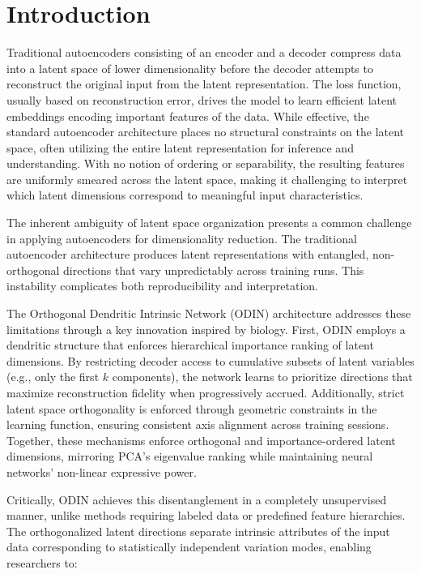 \documentclass[twoside,11pt]{article}
\begin{document}
\section{Introduction}
Traditional autoencoders consisting of an encoder and a decoder compress data into a latent space of lower dimensionality before the decoder attempts to reconstruct the original input from the latent representation. The loss function, usually based on reconstruction error, drives the model to learn efficient latent embeddings encoding important features of the data. While effective, the standard autoencoder architecture places no structural constraints on the latent space, often utilizing the entire latent representation for inference and understanding. With no notion of ordering or separability, the resulting features are uniformly smeared across the latent space, making it challenging to interpret which latent dimensions correspond to meaningful input characteristics. 

The inherent ambiguity of latent space organization presents a common challenge in applying autoencoders for dimensionality reduction. The traditional autoencoder architecture produces latent representations with entangled, non-orthogonal directions that vary unpredictably across training runs. This instability complicates both reproducibility and interpretation.

The Orthogonal Dendritic Intrinsic Network (ODIN) architecture addresses these limitations through a key innovation inspired by biology. First, ODIN employs a dendritic structure that enforces hierarchical importance ranking of latent dimensions. By restricting decoder access to cumulative subsets of latent variables (e.g., only the first $k$ components), the network learns to prioritize directions that maximize reconstruction fidelity when progressively accrued. Additionally, strict latent space orthogonality is enforced through geometric constraints in the learning function, ensuring consistent axis alignment across training sessions. Together, these mechanisms enforce orthogonal and importance-ordered latent dimensions, mirroring PCA's eigenvalue ranking while maintaining neural networks' non-linear expressive power.

Critically, ODIN achieves this disentanglement in a completely unsupervised manner, unlike methods requiring labeled data or predefined feature hierarchies. The orthogonalized latent directions separate intrinsic attributes of the input data corresponding to statistically independent variation modes, enabling researchers to:
\end{document}
